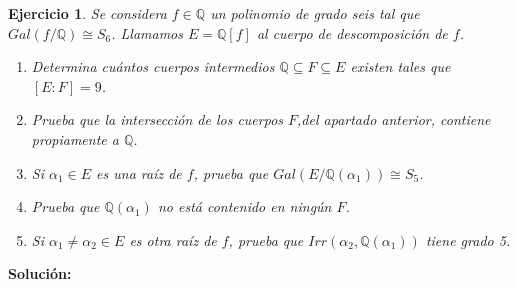 \documentclass{article}
\theoremstyle{theorem-style}  %
\theoremstyle{definition-style}
\theoremstyle{example-style}
\newtheorem{exercise}{Ejercicio}[section]
\begin{document}
\begin{exercise}
Se considera $f \in \mathbb{Q}$ un polinomio de grado seis tal que $Gal(f/\mathbb{Q}) \cong S_6$. Llamamos $E = \mathbb{Q}[f]$ al cuerpo de descomposición de $f$. 

\begin{enumerate}
\item Determina cuántos cuerpos intermedios $\mathbb{Q} \subseteq F \subseteq E$ existen tales que $[E:F] = 9$. 
\item Prueba que la intersección de los cuerpos $F$,del apartado anterior, contiene propiamente a $\mathbb{Q}$. 
\item Si $\alpha_1 \in E$ es una raíz de $f$, prueba que $Gal(E/\mathbb{Q}(\alpha_1)) \cong S_5$. 
\item Prueba que $\mathbb{Q}(\alpha_1)$ no está contenido en ningún $F$. 
\item Si $\alpha_1 \neq \alpha_2 \in E$ es otra raíz de $f$, prueba que $Irr(\alpha_2,\mathbb{Q}(\alpha_1))$ tiene grado 5. 
\end{enumerate}
\end{exercise}

\textbf{Solución: }
\end{document}
